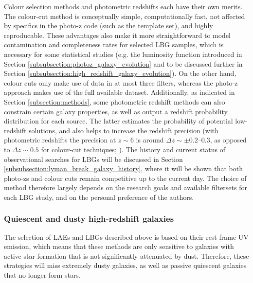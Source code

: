 Colour selection methods and photometric redshifts each have their own merits. The colour-cut method is conceptually simple, computationally fast, not affected by specifics in the photo-z code (such as the template set), and highly reproducable. These advantages also make it more straightforward to model contamination and completeness rates for selected LBG samples, which is necessary for some statistical studies (e.g. the luminosity function introduced in Section \ref{subsubsection:photoz_galaxy_evolution} and to be  discussed further in Section \ref{subsubsection:high_redshift_galaxy_evolution}). On the other hand, colour cuts only make use of data in at most three filters, whereas the photo-z approach makes use of the full available dataset. Additionally, as indicated in Section \ref{subsection:methods}, some photometric redshift methods can also constrain certain galaxy properties, as well as output a redshift probability distribution for each source. The latter estimates the probability of potential low-redshift solutions, and also helps to increase the redshift precision (with photometric redshifts the precision at $z\sim6$ is around $\Delta z \sim \pm 0.2\text{--}0.3$, as opposed to $\Delta z \sim0.5$ for colour-cut techniques; \citealt{2016PASA...33...37F}). The history and current status of observational searches for LBGs will be discussed in Section \ref{subsubsection:lyman_break_galaxy_history}, where it will be shown that both photo-zs and colour cuts remain competitive up to the current day. The choice of method therefore largely depends on the research goals and available filtersets for each LBG study, and on the personal preference of the authors. \par  




\subsubsection{Quiescent and dusty high-redshift galaxies}\label{subsubsection:dusty_quiescent}
The selection of LAEs and LBGs described above is based on their rest-frame UV emission, which means that these methods are only sensitive to galaxies with active star formation that is not significantly attenuated by dust. Therefore, these strategies will miss extremely dusty galaxies, as well as passive quiescent galaxies that no longer form stars. \par 

